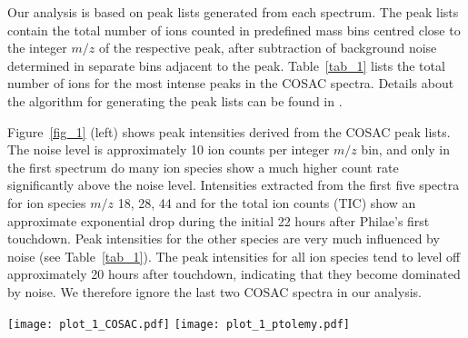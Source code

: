 \documentclass{aa}
\begin{document}
Our analysis is based on peak lists generated from each spectrum.  The peak lists contain the
total number of ions  counted in predefined mass bins
centred close to the integer $m/z$ of the respective peak, 
after subtraction of background noise determined in separate bins adjacent to the peak. 
Table~\ref{tab_1} lists the total number of ions for the most intense peaks in the COSAC
spectra. Details about the algorithm for generating the peak lists can be found in 
\citet[][Supplementary Material]{goesmann2015}.

Figure~\ref{fig_1} (left) shows peak intensities derived from the COSAC  peak lists.  
The noise level is approximately 10 ion counts per integer $m/z$ bin, and only in the first 
spectrum do many ion species show a much higher count rate significantly above the noise level. 
Intensities extracted from the first five spectra for ion species $m/z$ 18, 28, 44 and for the 
total ion counts (TIC) show an approximate exponential drop during the initial 22 hours after 
Philae's first touchdown. Peak intensities for the other species are very 
much influenced by noise (see Table~\ref{tab_1}).  The peak 
intensities for all ion 
species tend to level off approximately 20 hours after touchdown,  indicating that they 
become dominated by noise. We therefore ignore the last two COSAC spectra in our analysis.  

\begin{figure*}
\vspace{-6mm}
   \centering
   \hspace{-9mm}
      \vspace{-0.5cm}
\texttt{[image: plot\_1\_COSAC.pdf]} 
\hspace{-16mm}
\texttt{[image: plot\_1\_ptolemy.pdf]}
      \vspace{-5.5cm}
\caption[]{
{\em Left:} Temporal behaviour of ion species with $m/z$ 18 ($\mathrm{H_2O}$), 28 (CO), 44 (partially $\mathrm{CO_2}$) and total ion counts (TIC), 
respectively, derived from the seven COSAC spectra (raw counts, not corrected for instrumental background). 
{\em Right:} Ptolemy data taken from \citet[][their Tab.~3, corrected for hydrogen abstraction, a feature of the ion trap employed in Ptolemy]{morse2015}. The time axis  is set to zero at Philae's touchdown on 12 November 2014, 15:34:04~UTC %
(see text for details). 
}
\label{fig_1}
\end{figure*}
\end{document}
